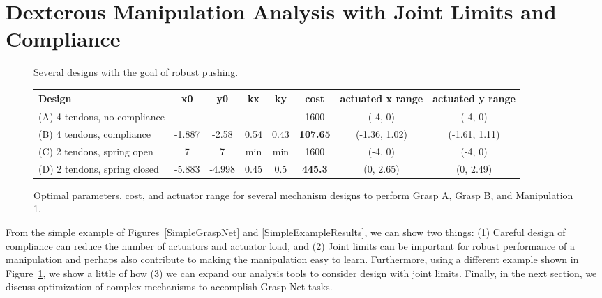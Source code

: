 \section{Dexterous Manipulation Analysis with Joint Limits and Compliance}

\begin{figure}
\begin{center}
\vspace*{2in}
\end{center}
\caption[]{Several designs with the goal of robust pushing.}
\label{PushExample}
\end{figure}

\begin{figure}
\begin{center}
\begin{tabular}{l|c|c|c|c|c|c|c|}
Design & x0 & y0 & kx & ky & cost &	actuated x range &	actuated y range \\ \hline
(A) 4 tendons, no compliance&	-&	-&	-&	-&	1600	&(-4, 0)	&(-4, 0)\\
(B) 4 tendons, compliance	&-1.887	&-2.58	&0.54&	0.43&	{\bf 107.65} &	(-1.36, 1.02)	&(-1.61, 1.11) \\
(C) 2 tendons, spring open&	7	&7	&min	&min	&1600	&(-4, 0)	&(-4, 0)\\
(D) 2 tendons, spring closed&	-5.883&	-4.998&	0.45&	0.5	& {\bf 445.3}  &	(0, 2.65)&	(0, 2.49)\\
\end{tabular}
\end{center}
\caption{Optimal parameters, cost, and actuator range for several mechanism designs to perform Grasp A, Grasp B, and Manipulation 1.}
\label{ComplianceAnalysis}
\end{figure}

From the simple example of Figures~\ref{SimpleGraspNet} and \ref{SimpleExampleResults}, we can show two things:  (1) Careful design of compliance can reduce the number of actuators and actuator load, and (2) Joint limits can be important for robust performance of a manipulation and perhaps also contribute to making the manipulation easy to learn.   Furthermore, using a different example shown in Figure~\ref{PushExample}, we show a little of how (3) we can expand our analysis tools to consider design with joint limits.  Finally, in the next section, we discuss optimization of complex mechanisms to accomplish Grasp Net tasks.

